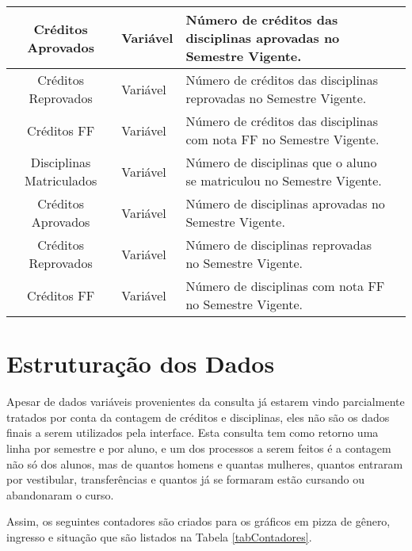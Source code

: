\documentclass[cic,tc]{iiufrgs}
\begin{document}
\begin{longtable}[c]{|c|p{3cm}|p{4cm}|p{2cm}|}
        Créditos Aprovados &
        Variável &
        Número de créditos das disciplinas aprovadas no Semestre Vigente. \\ \hline
        
        Créditos Reprovados &
        Variável &
        Número de créditos das disciplinas reprovadas no Semestre Vigente. \\ \hline
        
        Créditos FF &
        Variável &
        Número de créditos das disciplinas com nota FF no Semestre Vigente. \\ \hline
        
        Disciplinas Matriculados &
        Variável &
        Número de disciplinas que o aluno se matriculou no Semestre Vigente. \\ \hline
        
        Créditos Aprovados &
        Variável &
        Número de disciplinas aprovadas no Semestre Vigente. \\ \hline
        
        Créditos Reprovados &
        Variável &
        Número de disciplinas reprovadas no Semestre Vigente. \\ \hline
        
        Créditos FF &
        Variável &
        Número de disciplinas com nota FF no Semestre Vigente. \\ \hline

\end{longtable}

\section{Estruturação dos Dados}

    Apesar de dados variáveis provenientes da consulta já estarem vindo parcialmente tratados por conta da contagem de créditos e disciplinas, eles não são os dados finais a serem utilizados pela interface. Esta consulta tem como retorno uma linha por semestre e por aluno, e um dos processos a serem feitos é a contagem não só dos alunos, mas de quantos homens e quantas mulheres, quantos entraram por vestibular, transferências e quantos já se formaram estão cursando ou abandonaram o curso.
    
    Assim, os seguintes contadores são criados para os gráficos em pizza de gênero, ingresso e situação que são listados na Tabela \ref{tabContadores}.
\end{document}
